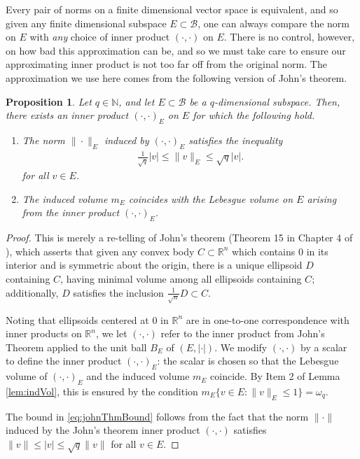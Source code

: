 \documentclass[11pt]{amsart}
\theoremstyle{theorem}
\newtheorem{prop}[thm]{Proposition}
\theoremstyle{definition}
\numberwithin{equation}{section}
\newcommand{\N}{\mathbb{N}}
\newcommand{\R}{\mathbb{R}}
\newcommand{\Bc}{\mathcal{B}}
\begin{document}
Every pair of norms on a finite dimensional vector space is equivalent, and so given any finite dimensional subspace $E \subset \Bc$, one can always compare the norm on $E$ with \emph{any} choice of inner product $(\cdot, \cdot)$ on $E$. There is no control, however, on how bad this approximation can be, and so we must take care to ensure our approximating inner product is not too far off from the original norm. The approximation we use here comes from the following version of John's theorem.

\begin{prop} \label{prop:johnThm}
Let $q \in \N$, and let $E \subset \Bc$ be a $q$-dimensional subspace. Then, there exists an inner product $(\cdot, \cdot)_E$ on $E$ for which the following hold.
\begin{enumerate}
\item The norm $\|\cdot\|_E$ induced by $(\cdot, \cdot)_E$ satisfies the inequality
	\begin{align} \label{eq:johnThmBound}
		\frac{1}{\sqrt{q}} |v| \leq \|v\|_E \leq \sqrt{q} |v|.
	\end{align}
	for all $v \in E$.
\item The induced volume $m_E$ coincides with the Lebesgue volume on $E$ arising from the inner product $(\cdot, \cdot)_E$.
\end{enumerate}
\end{prop}
\begin{proof}
This is merely a re-telling of John's theorem (Theorem 15 in Chapter 4 of \cite{Bo}), which asserts that given any convex body $C \subset \R^n$ which contains $0$ in its interior and is symmetric about the origin, there is a unique ellipsoid $D$ containing $C$, having minimal volume among all ellipsoids containing $C$; additionally, $D$ satisfies the inclusion $\frac{1}{\sqrt{n}} D \subset C$. 

Noting that ellipsoids centered at $0$ in $\R^n$ are in one-to-one correspondence with inner products on $\R^n$, we let $(\cdot, \cdot)$ refer to the inner product from John's Theorem applied to the unit ball $B_E$ of $(E, |\cdot|)$.  We modify $(\cdot, \cdot)$  by a scalar to define the inner product $(\cdot, \cdot)_E$: the scalar is chosen so that the Lebesgue volume of $(\cdot, \cdot)_E$ and the induced volume $m_E$ coincide. By Item 2 of Lemma \ref{lem:indVol}, this is ensured by the condition $m_E \{v \in E : \|v\|_E \leq 1\} = \omega_q$. 

The bound in \eqref{eq:johnThmBound} follows from the fact that the norm $\|\cdot\|$ induced by the John's theorem inner product $(\cdot, \cdot)$ satisfies $\|v\| \leq |v| \leq \sqrt{q} \|v\|$ for all $v \in E$.
\end{proof}
\end{document}

